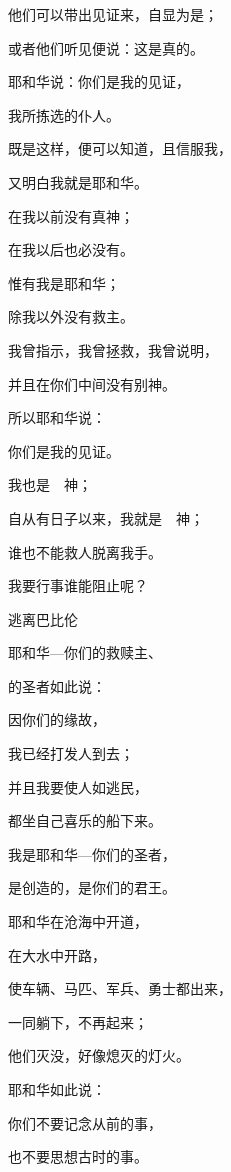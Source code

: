 {\par }{\Q 他们可以带出见证来，自显为是；
\par }{\Q 或者他们听见便说：这是真的。
\par }{\Q {}耶和华说：你们是我的见证，
\par }{\Q 我所拣选的仆人。
\par }{\Q 既是这样，便可以知道，且信服我，
\par }{\Q 又明白我就是耶和华。
\par }{\Q 在我以前没有真神；
\par }{\Q 在我以后也必没有。
\par }{\Q {}惟有我是耶和华；
\par }{\Q 除我以外没有救主。
\par }{\Q {}我曾指示，我曾拯救，我曾说明，
\par }{\Q 并且在你们中间没有别神。
\par }{\Q 所以耶和华说：
\par }{\Q 你们是我的见证。
\par }{\Q 我也是　神；
\par }{\Q {}自从有日子以来，我就是　神；
\par }{\Q 谁也不能救人脱离我手。
\par }{\Q 我要行事谁能阻止呢？
\par }{\SH 逃离巴比伦
\par }{\Q {}耶和华—你们的救赎主、
\par }{的圣者如此说：
\par }{\Q 因你们的缘故，
\par }{\Q 我已经打发人到{}去；
\par }{\Q 并且我要使{}人如逃民，
\par }{\Q 都坐自己喜乐的船下来。
\par }{\Q {}我是耶和华—你们的圣者，
\par }{\Q 是创造{}的，是你们的君王。
\par }{\Q {}耶和华在沧海中开道，
\par }{\Q 在大水中开路，
\par }{\Q {}使车辆、马匹、军兵、勇士都出来，
\par }{\Q 一同躺下，不再起来；
\par }{\Q 他们灭没，好像熄灭的灯火。
\par }{\Q {}耶和华如此说：
\par }{\Q 你们不要记念从前的事，
\par }{\Q 也不要思想古时的事。
}
